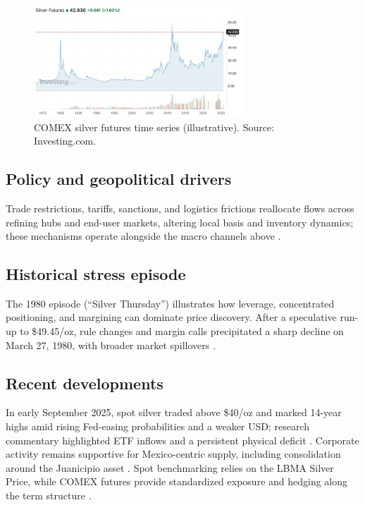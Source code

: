 \documentclass[10pt,a4paper]{article} %
\begin{document}
\begin{figure}[h]
\centering
\includegraphics[width=0.7\textwidth]{figures/silver_time_series.jpg}
\caption{COMEX silver futures time series (illustrative). Source: Investing.com.}
\label{fig:silver_time_series}
\end{figure}

\subsection{Policy and geopolitical drivers}
Trade restrictions, tariffs, sanctions, and logistics frictions reallocate flows across refining hubs and end-user markets, altering local basis and inventory dynamics; these mechanisms operate alongside the macro channels above \citep{silver_institute_wss_2024}.

\subsection{Historical stress episode}
The 1980 episode (“Silver Thursday”) illustrates how leverage, concentrated positioning, and margining can dominate price discovery. After a speculative run-up to \$49.45/oz, rule changes and margin calls precipitated a sharp decline on March 27, 1980, with broader market spillovers \citep{britannica_silver_thursday,nyt_1980_silver_thursday}.

\subsection{Recent developments}
In early September 2025, spot silver traded above \$40/oz and marked 14-year highs amid rising Fed-easing probabilities and a weaker USD; research commentary highlighted ETF inflows and a persistent physical deficit \citep{reuters_silver_14y_sep1,reuters_tradingday_sep11,reuters_anz_raises_silver,lbma_q2_2025}. Corporate activity remains supportive for Mexico-centric supply, including consolidation around the Juanicipio asset \citep{reuters_paasmag}. Spot benchmarking relies on the LBMA Silver Price, while COMEX futures provide standardized exposure and hedging along the term structure \citep{lbma_prices,cme_silver_overview}.
\end{document}
